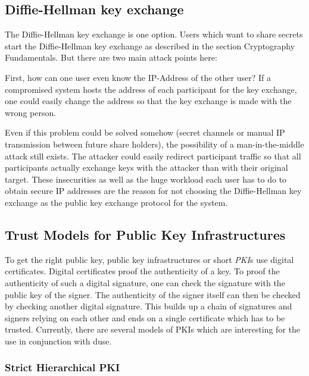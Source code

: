 \subsection{Diffie-Hellman key exchange}

The Diffie-Hellman key exchange is one option. Users which want to share secrets
start the Diffie-Hellman key exchange as described in the section Cryptography
Fundamentals. But there are two main attack points here:

First, how can one user even know the IP-Address of the other user? If a
compromised system hosts the address of each participant for the key exchange,
one could easily change the address so that the key exchange is made with the
wrong person.

Even if this problem could be solved somehow (secret channels or manual IP
transmission between future share holders), the possibility of a
man-in-the-middle attack still exists. The attacker could easily redirect
participant traffic so that all participants actually exchange keys with the
attacker than with their original target. These insecurities as well as the
huge workload each user has to do to obtain secure IP addresses are the reason
for not choosing the Diffie-Hellman key exchange as the public key exchange
protocol for the system.

\subsection{Trust Models for Public Key Infrastructures}

To get the right public key, public key infrastructures or short \textit{PKI}s use
digital certificates. Digital certificates proof the authenticity of a key. To proof
the authenticity of such a digital signature, one can check the signature with the
public key of the signer. The authenticity of the signer itself can then be checked
by checking another digital signature. This builds up a chain of signatures and 
signers relying on each other and ends on a single certificate which has to be trusted.
Currently, there are several models of PKIs which are interesting for the use
in conjunction with duse.

\subsubsection{Strict Hierarchical PKI}

